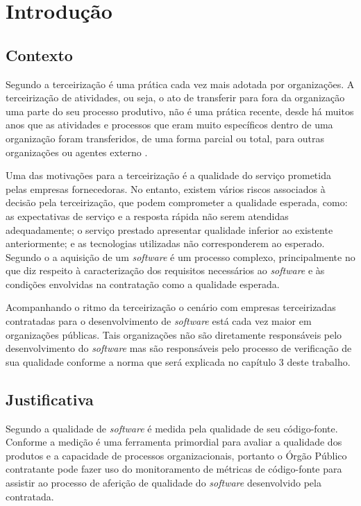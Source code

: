 \chapter{Introdução}

\section{Contexto}

Segundo\cite{WillcocksTercerizacao} a terceirização é uma prática cada vez mais adotada por organizações. A terceirização de atividades, ou seja, o ato de transferir para fora da organização uma parte do seu processo produtivo, não é uma prática recente, desde há muitos anos que as atividades e processos que eram muito específicos dentro de uma organização foram transferidos, de uma forma parcial ou total, para outras organizações ou agentes externo \cite{leite_terceirizacao}.

Uma das motivações para a terceirização é a qualidade do serviço prometida pelas empresas fornecedoras. No entanto, existem vários riscos associados à decisão pela terceirização, que podem comprometer a qualidade esperada, como: as expectativas de serviço e a resposta rápida não serem atendidas adequadamente; o serviço prestado apresentar qualidade inferior ao existente anteriormente; e as tecnologias utilizadas não corresponderem ao esperado\cite{WillcocksTercerizacao}. Segundo o \cite{GuiaAquisicao} a aquisição de um \textit {software} é um processo complexo, principalmente no que diz respeito à caracterização dos requisitos necessários ao \textit {software} e às condições envolvidas na contratação como a qualidade esperada. 
 
Acompanhando o ritmo da terceirização o cenário com empresas terceirizadas contratadas para o desenvolvimento de \textit {software} está cada vez maior em organizações públicas. Tais organizações não são diretamente responsáveis pelo desenvolvimento do \textit {software} mas são responsáveis  pelo processo de verificação de sua qualidade conforme a norma  que será explicada no capítulo 3 deste trabalho.


\section{Justificativa}

Segundo \cite{beck1999}\cite{fowler1999refactoring} a qualidade de \textit{software} é medida pela qualidade de seu código-fonte. Conforme a \cite{ISO:15939} medição é uma ferramenta primordial para avaliar a qualidade dos produtos e a capacidade de processos organizacionais, portanto o Órgão Público contratante pode fazer uso do monitoramento de métricas de código-fonte para assistir ao processo de aferição de qualidade do \textit{software} desenvolvido pela contratada.


